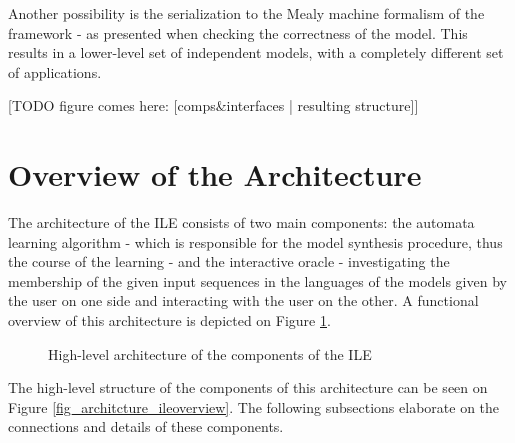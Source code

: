 Another possibility is the serialization to the Mealy machine formalism of the framework - as presented when checking the correctness of the model. This results in a lower-level set of independent models, with a completely different set of applications.

[TODO figure comes here: [comps\&interfaces | resulting structure]]
\clearpage
\section{Overview of the Architecture} \label{sec_architecture}

The architecture of the ILE consists of two main components: the automata learning algorithm - which is responsible for the model synthesis procedure, thus the course of the learning - and the interactive oracle - investigating the membership of the given input sequences in the languages of the models given by the user on one side and interacting with the user on the other. A functional overview of this architecture is depicted on Figure \ref{fig_architcture_informaloverview}. 

\begin{figure}[!ht] 
	\centering
	\caption{High-level architecture of the components of the ILE} 
	\label{fig_architcture_informaloverview}
\end{figure}

The high-level structure of the components of this architecture can be seen on Figure \ref{fig_architcture_ileoverview}. The following subsections elaborate on the connections and details of these components.

